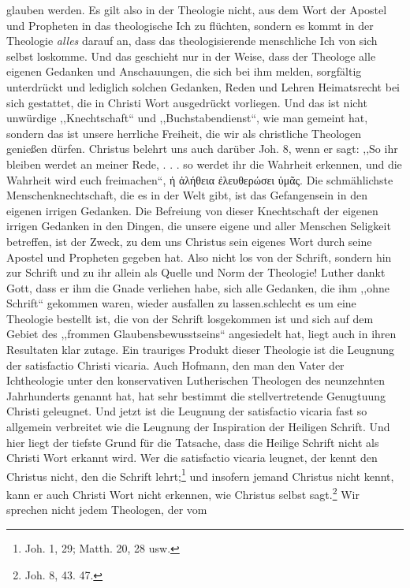 glauben werden. Es gilt also in der Theologie nicht, aus dem Wort der Apostel und Propheten in das theologische Ich zu flüchten, sondern es kommt in der Theologie \emph{alles} darauf an, dass das theologisierende menschliche Ich von sich selbst loskomme. Und das geschieht nur in der Weise, dass der Theologe alle eigenen Gedanken und Anschauungen, die sich bei ihm melden, sorgfältig unterdrückt und lediglich solchen Gedanken, Reden und Lehren Heimatsrecht bei sich gestattet, die in Christi Wort ausgedrückt vorliegen. Und das ist nicht unwürdige ,,Knechtschaft`` und ,,Buchstabendienst``, wie man gemeint hat, sondern das ist unsere herrliche Freiheit, die wir als christliche Theologen genießen dürfen. Christus belehrt uns auch darüber Joh. 8, wenn er sagt: ,,So ihr bleiben werdet an meiner Rede, . . . so werdet ihr die Wahrheit erkennen, und die Wahrheit wird euch freimachen``, ἡ ἀλήθεια ἐλευθερώσει ὑμᾶς. Die schmählichste Menschenknechtschaft, die es in der Welt gibt, ist das Gefangensein in den eigenen irrigen Gedanken. Die Befreiung von dieser Knechtschaft der eigenen irrigen Gedanken in den Dingen, die unsere eigene und aller Menschen Seligkeit betreffen, ist der Zweck, zu dem uns Christus sein eigenes Wort durch seine Apostel und Propheten gegeben hat. Also nicht los von der Schrift, sondern hin zur Schrift und zu ihr allein als Quelle und Norm der Theologie! Luther dankt Gott, dass er ihm die Gnade verliehen habe, sich alle Gedanken, die ihm ,,ohne Schrift`` gekommen waren, wieder ausfallen zu lassen.\n\nWie schlecht es um eine Theologie bestellt ist, die von der Schrift losgekommen ist und sich auf dem Gebiet des ,,frommen Glaubensbewusstseins`` angesiedelt hat, liegt auch in ihren Resultaten klar zutage. Ein trauriges Produkt dieser Theologie ist die Leugnung der satisfactio Christi vicaria. Auch Hofmann, den man den Vater der Ichtheologie unter den konservativen Lutherischen Theologen des neunzehnten Jahrhunderts genannt hat, hat sehr bestimmt die stellvertretende Genugtuung Christi geleugnet. Und jetzt ist die Leugnung der satisfactio vicaria fast so allgemein verbreitet wie die Leugnung der Inspiration der Heiligen Schrift. Und hier liegt der tiefste Grund für die Tatsache, dass die Heilige Schrift nicht als Christi Wort erkannt wird. Wer die satisfactio vicaria leugnet, der kennt den Christus nicht, den die Schrift lehrt;\footnote{Joh. 1, 29; Matth. 20, 28 usw.} und insofern jemand Christus nicht kennt, kann er auch Christi Wort nicht erkennen, wie Christus selbst sagt.\footnote{Joh. 8, 43. 47.} Wir sprechen nicht jedem Theologen, der vom